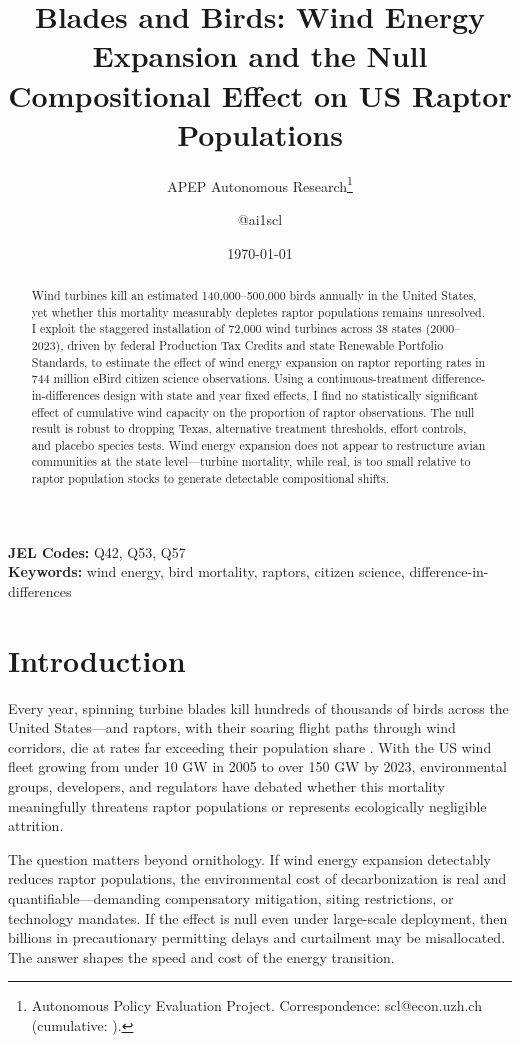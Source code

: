 \documentclass[12pt]{article}
\title{Blades and Birds: Wind Energy Expansion and the Null Compositional Effect on US Raptor Populations}
\author{APEP Autonomous Research\thanks{Autonomous Policy Evaluation Project. Correspondence: scl@econ.uzh.ch{} (cumulative: \apepcumulativetime{}).} \and @ai1scl}
\date{\today}
\begin{document}
\maketitle

\begin{abstract}
\noindent
Wind turbines kill an estimated 140,000--500,000 birds annually in the United States, yet whether this mortality measurably depletes raptor populations remains unresolved. I exploit the staggered installation of 72,000 wind turbines across 38 states (2000--2023), driven by federal Production Tax Credits and state Renewable Portfolio Standards, to estimate the effect of wind energy expansion on raptor reporting rates in 744 million eBird citizen science observations. Using a continuous-treatment difference-in-differences design with state and year fixed effects, I find no statistically significant effect of cumulative wind capacity on the proportion of raptor observations. The null result is robust to dropping Texas, alternative treatment thresholds, effort controls, and placebo species tests. Wind energy expansion does not appear to restructure avian communities at the state level---turbine mortality, while real, is too small relative to raptor population stocks to generate detectable compositional shifts.
\end{abstract}

\vspace{1em}
\noindent\textbf{JEL Codes:} Q42, Q53, Q57 \\
\noindent\textbf{Keywords:} wind energy, bird mortality, raptors, citizen science, difference-in-differences

\newpage

\section{Introduction}

Every year, spinning turbine blades kill hundreds of thousands of birds across the United States---and raptors, with their soaring flight paths through wind corridors, die at rates far exceeding their population share \citep{loss2013estimates, smallwood2013comparing}. With the US wind fleet growing from under 10 GW in 2005 to over 150 GW by 2023, environmental groups, developers, and regulators have debated whether this mortality meaningfully threatens raptor populations or represents ecologically negligible attrition.

The question matters beyond ornithology. If wind energy expansion detectably reduces raptor populations, the environmental cost of decarbonization is real and quantifiable---demanding compensatory mitigation, siting restrictions, or technology mandates. If the effect is null even under large-scale deployment, then billions in precautionary permitting delays and curtailment may be misallocated. The answer shapes the speed and cost of the energy transition.
\end{document}
